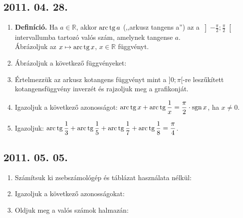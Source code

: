 \subsection*{2011. 04. 28.}
\begin{enumerate}
\item \textbf{Definíció.} Ha $a\in\mathbb R$, akkor $\mathop{\mathrm{arc}}\nolimits\mathop{\mathrm{tg}}\nolimits a$ (,,arkusz tangens a'') az a $\left]-\frac{\pi}{2};\frac{\pi}{2}\right[$ intervallumba tartozó valós szám, amelynek tangense $a$.\\
Ábrázoljuk az $x\mapsto\mathop{\mathrm{arc}}\nolimits\mathop{\mathrm{tg}}\nolimits x$, $x\in\mathbb R$ függvényt.
\item Ábrázoljuk a következő függvényeket:
\item Értelmezzük az arkusz kotangens függvényt mint a $]0;\pi[$-re leszűkített kotangensfüggvény inverzét és rajzoljuk meg a grafikonját.
\item Igazoljuk a következő azonosságot: $\mathop{\mathrm{arc}}\nolimits\mathop{\mathrm{tg}}\nolimits x+\mathop{\mathrm{arc}}\nolimits\mathop{\mathrm{tg}}\nolimits\dfrac{1}{x}=\dfrac{\pi}{2}\cdot\mathop{\mathrm{sgn}}\nolimits x$, ha $x\ne 0$.
\item Igazoljuk: $\mathop{\mathrm{arc}}\nolimits\mathop{\mathrm{tg}}\nolimits\dfrac13+\mathop{\mathrm{arc}}\nolimits\mathop{\mathrm{tg}}\nolimits\dfrac15+\mathop{\mathrm{arc}}\nolimits\mathop{\mathrm{tg}}\nolimits\dfrac17+\mathop{\mathrm{arc}}\nolimits\mathop{\mathrm{tg}}\nolimits\dfrac18=\dfrac{\pi}{4}$.
\end{enumerate}

\subsection*{2011. 05. 05.}
\begin{enumerate}
\item Számítsuk ki zsebszámológép és táblázat használata nélkül:
\item Igazoljuk a következő azonosságokat:
\item Oldjuk meg a valós számok halmazán:
\end{enumerate}

